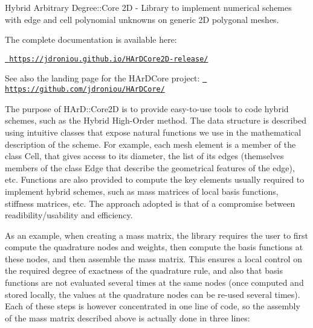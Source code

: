 Hybrid Arbitrary Degree\+::\+Core 2D -\/ Library to implement numerical schemes with edge and cell polynomial unknowns on generic 2D polygonal meshes.

The complete documentation is available here\+:

\href{https://jdroniou.github.io/HArDCore2D-release/}{\texttt{ https\+://jdroniou.\+github.\+io/\+H\+Ar\+D\+Core2\+D-\/release/}}

See also the landing page for the H\+Ar\+D\+Core project\+: \href{https://github.com/jdroniou/HArDCore/}{\texttt{ https\+://github.\+com/jdroniou/\+H\+Ar\+D\+Core/}}

The purpose of H\+Ar\+D\+::\+Core2D is to provide easy-\/to-\/use tools to code hybrid schemes, such as the Hybrid High-\/\+Order method. The data structure is described using intuitive classes that expose natural functions we use in the mathematical description of the scheme. For example, each mesh element is a member of the class \textquotesingle{}Cell\textquotesingle{}, that gives access to its diameter, the list of its edges (themselves members of the class \textquotesingle{}Edge\textquotesingle{} that describe the geometrical features of the edge), etc. Functions are also provided to compute the key elements usually required to implement hybrid schemes, such as mass matrices of local basis functions, stiffness matrices, etc. The approach adopted is that of a compromise between readibility/usability and efficiency.

As an example, when creating a mass matrix, the library requires the user to first compute the quadrature nodes and weights, then compute the basis functions at these nodes, and then assemble the mass matrix. This ensures a local control on the required degree of exactness of the quadrature rule, and also that basis functions are not evaluated several times at the same nodes (once computed and stored locally, the values at the quadrature nodes can be re-\/used several times). Each of these steps is however concentrated in one line of code, so the assembly of the mass matrix described above is actually done in three lines\+:


\begin{DoxyCode}{0}
\end{DoxyCode}


